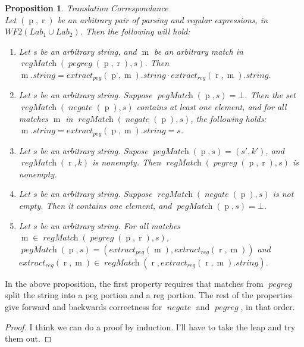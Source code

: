 \documentclass[11pt]{article}
\newcommand{\synPeg}{\ensuremath{\operatorname{p}}}
\newcommand{\synReg}{\ensuremath{\operatorname{r}}}
\newcommand{\metaMatch}{\ensuremath{\operatorname{m}}}
\newcommand{\setWFTwo}{\mathit{WF2}}
\newcommand{\setLab}{\mathit{Lab}}
\newcommand{\funPEGREG}{\operatorname{\mathit{pegreg}}}
\newcommand{\funPegMatch}{\operatorname{\mathit{pegMatch}}}
\newcommand{\funRegMatch}{\operatorname{\mathit{regMatch}}}
\newcommand{\funNegate}{\operatorname{\mathit{negate}}}
\newcommand{\funExtractPeg}{\operatorname{\mathit{extract_{peg}}}}
\newcommand{\funExtractReg}{\operatorname{\mathit{extract_{reg}}}}
\newtheorem{proposition}{Proposition}
\begin{document}
\begin{proposition} Translation Correspondance \\
  Let $(\synPeg, \synReg)$ be an arbitrary pair of parsing and regular expressions, in
  $\setWFTwo(\setLab_1 \cup \setLab_2)$. Then the following will hold:

  \begin{enumerate}
  \item Let $s$ be an arbitrary string, and $\metaMatch$ be an arbitrary match in
    $\funRegMatch(\funPEGREG(\synPeg, \synReg), s)$. Then
    $\metaMatch.\mathit{string} = \funExtractPeg(\synPeg, \metaMatch).string \cdot \funExtractReg(\synReg, \metaMatch).string$.

  \item Let $s$ be an arbitrary string. Suppose $\funPegMatch(\synPeg, s) = \bot$.
    Then the set $\funRegMatch(\funNegate(\synPeg), s)$ contains at least one element, and
    for all matches $\metaMatch$ in $\funRegMatch(\funNegate(\synPeg), s)$, the following
    holds: $\metaMatch.{\mathit{string}} = \funExtractPeg(\synPeg, \metaMatch).{\mathit{string}} = s$.

  \item Let $s$ be an arbitrary string. Supose $\funPegMatch(\synPeg, s) = (s', k')$, and
    $\funRegMatch(\synReg, k)$ is nonempty. Then $\funRegMatch(\funPEGREG(\synPeg, \synReg), s)$ is nonempty.

  \item Let $s$ be an arbitrary string. Suppose $\funRegMatch(\funNegate(\synPeg), s)$ is
    not empty. Then it contains one element, and $\funPegMatch(\synPeg, s) = \bot$.

  \item Let $s$ be an arbitrary string. For all matches
    $\metaMatch \in \funRegMatch(\funPEGREG(\synPeg, \synReg), s)$,
    $\funPegMatch(\synPeg, s) = (\funExtractPeg(\metaMatch), \funExtractReg(\synReg, \metaMatch))$ and
    $\funExtractReg(\synReg, \metaMatch) \in \funRegMatch(\synReg, \funExtractReg(\synReg, \metaMatch).\mathit{string})$.
  \end{enumerate}
\end{proposition}

In the above proposition, the first property requires that matches
from $\funPEGREG$ split the string into a peg portion and a reg portion.
The rest of the properties give forward and backwards correctness for
$\funNegate$ and $\funPEGREG$, in that order.

\begin{proof}
  I think we can do a proof by induction. I'll have to take the leap
  and try them out.
\end{proof}
\end{document}
